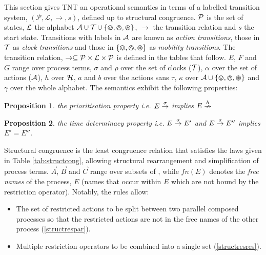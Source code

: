 \documentclass[orivec,envcountsame]{llncs}
\newtheorem{prop}{Proposition}
\begin{document}
This section gives TNT an operational semantics in terms of a labelled
transition system, $(\mathcal{P}, \mathcal{L}, \rightarrow, s)$, defined
up to structural congruence.  $\text{$\mathcal{P}$}$ is the set of states, $\text{$\mathcal{L}$}$ the
alphabet $\text{$\mathcal{A}$} \cup \text{$\mathcal{T}$} \cup \text{$\{ \varovee, \varowedge , \varoast\}$}$, $\rightarrow$ the
transition relation and $s$ the start state.  Transitions with labels in
$\text{$\mathcal{A}$}$ are known as \emph{action transitions}, those in $\text{$\mathcal{T}$}$ as
\emph{clock transitions} and those in $\text{$\{ \varovee, \varowedge , \varoast\}$}$ as \emph{mobility
transitions}.  The transition relation, $\rightarrow \subseteq
\text{$\mathcal{P}$} \times \text{$\mathcal{L}$} \times \text{$\mathcal{P}$}$ is defined in the tables that follow.
$E$, $F$ and $G$ range over process terms, $\sigma$ and $\rho$ over the
set of clocks ($\text{$\mathcal{T}$}$), $\alpha$ over the set of actions
($\text{$\mathcal{A}$}$), $h$ over $\text{$\mathcal{H}$}$, $a$ and $b$ over the actions
sans $\tau$, $\kappa$ over $\text{$\mathcal{A}$} \cup \text{$\{ \varovee, \varowedge , \varoast\}$}$
and $\gamma$ over the whole alphabet.  The semantics exhibit the
following properties:
\begin{prop}
the prioritisation property
i.e. $E \stackrel{\sigma}{\rightarrow}$ implies $E \stackrel{h}{\nrightarrow}$ 
\end{prop}
\begin{prop}
the time determinacy property i.e. $E \stackrel{\sigma}{\rightarrow} E'$ and $E
\stackrel{\sigma}{\rightarrow} E''$ implies $E' = E''$.
\end{prop}
Structural congruence is the least congruence relation that satisfies
the laws given in Table \ref{tab:structcong}, allowing structural
rearrangement and simplification of process terms. $\vec{A}$, $\vec{B}$
and $\vec{C}$ range over subsets of \actions, while $fn(E)$ denotes the
\emph{free names} of the process, $E$ (names that occur within $E$ which
are not bound by the restriction operator).  Notably, the rules allow:
 
\begin{itemize}
\item The set of restricted actions to be split between two parallel
      composed processes so that the restricted actions are not in the
      free names of the other process \textsf{(\ref{structrespar})}.
\item Multiple restriction operators to be combined into a single set
      \textsf{(\ref{structresres})}.
\end{itemize}
\end{document}
